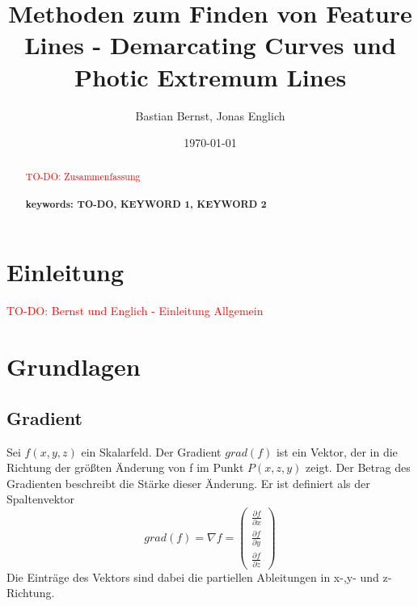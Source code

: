 \documentclass{paperStyle}
\title{Methoden zum Finden von Feature Lines - Demarcating Curves und Photic Extremum Lines}
\author{Bastian Bernst, Jonas Englich}
\date{\today}
\newcommand\todo[1]{\textcolor{red}{#1}}
\begin{document}
\maketitle

\begin{abstract}
   \todo{TO-DO: Zusammenfassung}\\
    \\
\textbf{keywords: TO-DO, KEYWORD 1, KEYWORD 2}

\end{abstract}

\section{Einleitung}
\todo{TO-DO: Bernst und Englich - Einleitung Allgemein}
\section{Grundlagen}

\subsection{Gradient}

Sei $f(x,y,z)$ ein Skalarfeld. Der Gradient $grad(f)$ ist ein Vektor, der in die Richtung der größten Änderung von f im Punkt $P(x,z,y)$ zeigt. Der Betrag des Gradienten beschreibt die Stärke dieser Änderung. Er ist definiert als der Spaltenvektor
\begin{equation}
grad(f) = \nabla f = \left(\begin{array}{c}\frac{\partial f}{\partial x} \\ \frac{\partial f}{\partial y} \\ \frac{\partial f}{\partial z}\end{array}\right)
\end{equation} 
Die Einträge des Vektors sind dabei die partiellen Ableitungen in x-,y- und z-Richtung.
\end{document}
